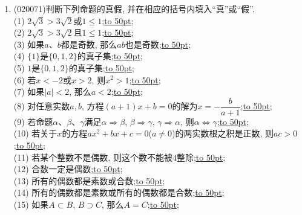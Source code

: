 \documentclass[10pt,a4paper]{article}
\newcommand{\blank}[1]{\underline{\hbox to #1pt{}}}
\begin{document}
\begin{enumerate}[1.]
\begin{center}
\end{center}
\item {\tiny (020071)}判断下列命题的真假, 并在相应的括号内填入``真''或``假''.\\
(1) $2\sqrt 3>3\sqrt 2$或$1\le 1$;\blank{50};\\
(2) $2\sqrt 3>3\sqrt 2$且$1\le1$;\blank{50};\\
(3) 如果$a$、$b$都是奇数, 那么$ab$也是奇数;\blank{50};\\
(4) $\{1\}$是$\{0, 1, 2\}$的真子集;\blank{50};\\
(5) $1$是$\{0, 1, 2\}$的真子集;\blank{50};\\
(6) 若$x<-2$或$x>2$, 则$x^2>1$;\blank{50};\\
(7) 如果$|a|<2$, 那么$a<2$;\blank{50};\\
(8) 对任意实数$a,b$, 方程$(a+1)x+b=0$的解为$x=-\dfrac b{a+1}$;\blank{50};\\
(9) 若命题$\alpha$、$\beta$、$\gamma$满足$\alpha\Rightarrow \beta$, $\beta\Rightarrow \gamma$, $\gamma\Rightarrow \alpha$, 则$\alpha\Leftrightarrow \gamma$;\blank{50};\\
(10) 若关于$x$的方程$ax^2+bx+c=0$($a\ne 0$)的两实数根之积是正数, 则$ac>0$;\blank{50};\\
(11) 若某个整数不是偶数, 则这个数不能被$4$整除;\blank{50};\\
(12) 合数一定是偶数;\blank{50};\\
(13) 所有的偶数都是素数或合数;\blank{50};\\
(14) 所有的偶数都是素数或所有的偶数都是合数;\blank{50};\\
(15) 如果$A\subset B$, $B\supset C$, 那么$A=C$;\blank{50};\\

\end{enumerate}
\end{document}
